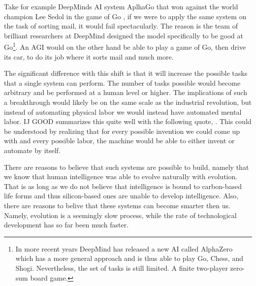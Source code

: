 \documentclass[12pt,A4]{report}
\theoremstyle{definition}
\begin{document}
Take for example DeepMinds AI system AplhaGo that won against the world champion Lee Sedol in the game of Go \autocite{DeepMind}, if we were to apply the same system on the task of sorting mail, it would fail spectacularly. The reason is the team of brilliant researchers at DeepMind designed the model specifically to be good at Go\footnote{In more recent years DeepMind has released a new AI called AlphaZero which has a more general approach and is thus able to play Go, Chess, and Shogi\autocite{Deepmind2}. Nevertheless, the set of tasks is still limited. A finite two-player zero-sum board game.}. An AGI would on the other hand be able to play a game of Go, then drive its car, to do its job where it sorts mail and much more. 

The significant difference with this shift is that it will increase the possible tasks that a single system can perform. The number of tasks possible would become arbitrary and be performed at a human level or higher. The implications of such a breakthrough would likely be on the same scale as the industrial revolution, but instead of automating physical labor we would instead have automated mental labor. IJ GOOD summarizes this quite well with the following quote, \autocite{I.J Good}. This could be understood by realizing that for every possible invention we could come up with and every possible labor, the machine would be able to either invent or automate by itself.

There are reasons to believe that such systems are possible to build, namely that we know that human intelligence was able to evolve naturally with evolution. That is as long as we do not believe that intelligence is bound to carbon-based life forms and thus silicon-based ones are unable to develop intelligence. Also, there are reasons to belive that these systems can become smarter then us. Namely, evolution is a seemingly slow process, while the rate of technological development has so far been much faster.
\end{document}
